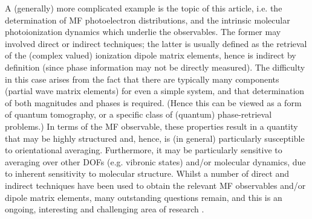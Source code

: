 A (generally) more complicated example is the topic of this article, i.e. the determination of MF photoelectron distributions, and the intrinsic molecular photoionization dynamics which underlie the observables.  The former may involved direct or indirect techniques; the latter is usually defined as the retrieval of the (complex valued) ionization dipole matrix elements, hence is indirect by definition (since phase information may not be directly measured). The difficulty in this case arises from the fact that there are typically many components (partial wave matrix elements) for even a simple system, and that determination of both magnitudes and phases is required. (Hence this can be viewed as a form of quantum tomography, or a specific class of (quantum) phase-retrieval problems.) In terms of the MF observable, these properties result in a quantity that may be highly structured and, hence, is (in general) particularly susceptible to orientational averaging. Furthermore, it may be particularly sensitive to averaging over other DOFs (e.g. vibronic states) and/or molecular dynamics, due to inherent sensitivity to molecular structure. Whilst a number of direct and indirect techniques have been used to obtain the relevant MF observables and/or dipole matrix elements, many outstanding questions remain, and this is an ongoing, interesting and challenging area of research \cite{hockett2018QuantumMetrologyPhotoelectrons,hockett2018QuantumMetrologyPhotoelectronsa}.
